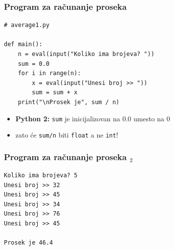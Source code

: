 \documentclass[utf8,compress]{beamer}
\begin{document}


\begin{frame}[fragile]
  \frametitle{Program za računanje proseka}
\begin{verbatim}
# average1.py

def main():
    n = eval(input("Koliko ima brojeva? "))
    sum = 0.0
    for i in range(n):
        x = eval(input("Unesi broj >> "))
        sum = sum + x
    print("\nProsek je", sum / n)
\end{verbatim}
  \begin{itemize}
    \item \textbf{Python 2:} \texttt{sum} je inicijalizovan na 0.0 umesto na 0
    \item zato će \texttt{sum/n} biti \texttt{float} a ne \texttt{int}!
  \end{itemize}
\end{frame}

\begin{frame}[fragile]
  \frametitle{Program za računanje proseka $_2$}
\begin{verbatim}
Koliko ima brojeva? 5
Unesi broj >> 32
Unesi broj >> 45
Unesi broj >> 34
Unesi broj >> 76
Unesi broj >> 45

Prosek je 46.4
\end{verbatim}
\end{frame}
\end{document}
